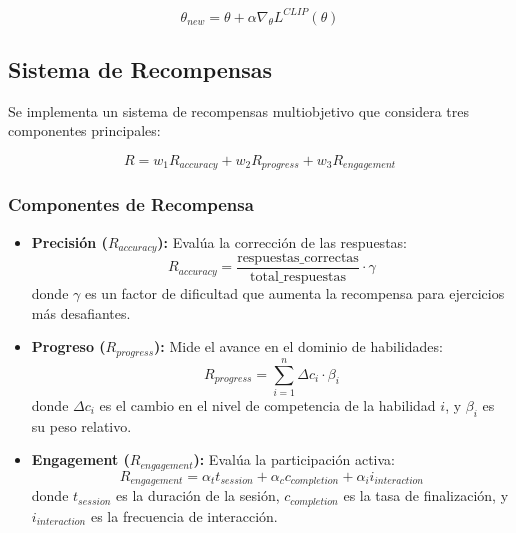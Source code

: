 \begin{equation}
    \theta_{new} = \theta + \alpha \nabla_\theta L^{CLIP}(\theta)
\end{equation}

\subsection{Sistema de Recompensas}
\label{sistema-recompensas}

Se implementa un sistema de recompensas multiobjetivo que considera tres componentes principales:

\begin{equation}
    \label{eq:reward}
    R = w_1R_{accuracy} + w_2R_{progress} + w_3R_{engagement}
\end{equation}

\subsubsection{Componentes de Recompensa}

\begin{itemize}
    \item \textbf{Precisión ($R_{accuracy}$):} Evalúa la corrección de las respuestas:
    \begin{equation}
        R_{accuracy} = \frac{\text{respuestas\_correctas}}{\text{total\_respuestas}} \cdot \gamma
    \end{equation}
    donde $\gamma$ es un factor de dificultad que aumenta la recompensa para ejercicios más desafiantes.

    \item \textbf{Progreso ($R_{progress}$):} Mide el avance en el dominio de habilidades:
    \begin{equation}
        R_{progress} = \sum_{i=1}^n \Delta c_i \cdot \beta_i
    \end{equation}
    donde $\Delta c_i$ es el cambio en el nivel de competencia de la habilidad $i$, y $\beta_i$ es su peso relativo.

    \item \textbf{Engagement ($R_{engagement}$):} Evalúa la participación activa:
    \begin{equation}
        R_{engagement} = \alpha_t t_{session} + \alpha_c c_{completion} + \alpha_i i_{interaction}
    \end{equation}
    donde $t_{session}$ es la duración de la sesión, $c_{completion}$ es la tasa de finalización, y $i_{interaction}$ es la frecuencia de interacción.
\end{itemize}

